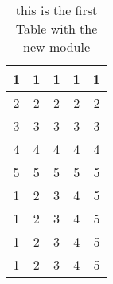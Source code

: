 \begin{table}[!h]
	\centering
	\begin{tabular}{c|c|c|c|c}
		1 & 1 & 1 & 1 & 1\\\hline
		2 & 2 & 2 & 2 & 2\\\hline
		3 & 3 & 3 & 3 & 3\\\hline
		4 & 4 & 4 & 4 & 4\\\hline
		5 & 5 & 5 & 5 & 5\\\hline
		1 & 2 & 3 & 4 & 5\\\hline
		1 & 2 & 3 & 4 & 5\\\hline
		1 & 2 & 3 & 4 & 5\\\hline
		1 & 2 & 3 & 4 & 5\\
	\end{tabular}
	\caption{this is the first Table with the new module \label{tab:theFirst}}
\end{table}
